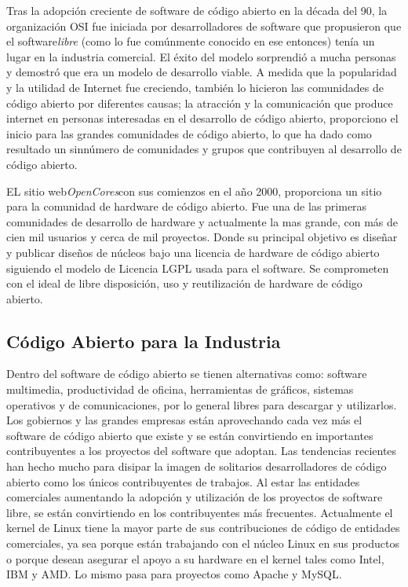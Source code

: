 	Tras la adopción creciente de software de código abierto en la década del 90, la organización OSI fue iniciada por desarrolladores de software que propusieron que el 					software\textit{libre} (como lo fue comúnmente conocido en ese entonces) tenía un lugar en la industria comercial. El éxito del modelo sorprendió a mucha personas y demostró 		que era un modelo de desarrollo viable. A medida que la popularidad y la utilidad de Internet fue creciendo, también lo hicieron las comunidades de código abierto por 					diferentes causas; la atracción y la comunicación que produce internet en personas interesadas en el desarrollo de código abierto, proporciono el inicio para las grandes
	comunidades de código abierto, lo que ha dado como resultado un sinnúmero de comunidades y grupos que contribuyen al desarrollo de código abierto.


	EL sitio web\textit{OpenCores}con sus comienzos en el año 2000, proporciona un sitio para la comunidad de hardware de código abierto.
 	Fue una de las primeras comunidades de desarrollo de hardware y actualmente la mas grande, con más de cien mil usuarios y cerca de mil proyectos. Donde su
	principal objetivo es diseñar y publicar diseños de núcleos bajo una licencia de hardware de código abierto siguiendo el modelo de Licencia LGPL usada para el software.
	Se comprometen con el ideal de libre disposición, uso y reutilización de hardware de código abierto.\cite{Etiqueta10}

	\subsection{Código Abierto para la Industria}

	Dentro del software de código abierto se tienen alternativas como: software multimedia, productividad de oficina, herramientas de
	gráficos, sistemas operativos y de comunicaciones, por lo general libres para descargar y utilizarlos. Los gobiernos y las grandes empresas están aprovechando cada 			vez más el software de código abierto que existe y se están convirtiendo en importantes contribuyentes a los proyectos del software que adoptan. Las tendencias recientes han hecho mucho para disipar la imagen de solitarios desarrolladores de código abierto como los únicos contribuyentes de trabajos. Al estar las entidades comerciales aumentando la adopción y utilización de los proyectos de software libre,  se están convirtiendo en los contribuyentes más frecuentes. Actualmente el kernel de Linux tiene la mayor parte de sus contribuciones de código de entidades comerciales, ya sea porque están trabajando con el núcleo Linux en sus productos o porque desean asegurar el apoyo a su hardware en el kernel tales como Intel,  IBM y AMD. Lo mismo pasa para proyectos como Apache y MySQL.

